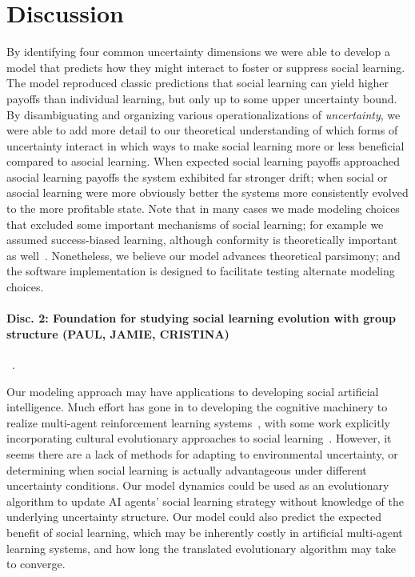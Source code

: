 \documentclass[letterpaper,11.5pt]{scrartcl}
\begin{document}
\section{Discussion}

By identifying four common uncertainty dimensions we were able to develop a model
that predicts how they might interact to foster or suppress social learning.
The model reproduced classic predictions that social learning can yield higher
payoffs than individual learning, but only up to some upper uncertainty bound.
By disambiguating and organizing various operationalizations of \emph{uncertainty},
we were able to add more detail to our theoretical understanding of which forms
of uncertainty interact in which ways to make social learning more or less
beneficial compared to asocial learning. When expected social learning payoffs
approached asocial learning payoffs the system exhibited far stronger drift; when
social or asocial learning were more obviously better the systems more consistently
evolved to the more profitable state. Note that in many cases we made modeling choices
that excluded some important mechanisms of social learning; for example we 
assumed success-biased learning, although conformity is theoretically important
as well~\cite{Muthukrishna2016a,Smaldino2018b}. Nonetheless, we believe our model
advances theoretical parsimony; and the software implementation is designed to
facilitate testing alternate modeling choices. 

\paragraph{Disc. 2: Foundation for studying social learning evolution with group
structure (PAUL, JAMIE, CRISTINA)}~\cite{Katsnelson2014}.

Our modeling approach may have applications to developing social artificial 
intelligence. Much effort has gone in to developing the cognitive machinery
to realize multi-agent reinforcement learning
systems~\cite{Sandholm1996,Ndousse2021,Gronauer2022}, with some work explicitly
incorporating cultural evolutionary approaches to social learning~\cite{Jaques2019}.
However, it seems there are a lack of methods for adapting
to environmental uncertainty, or determining when social learning is actually
advantageous under different uncertainty conditions. Our model dynamics could
be used as an evolutionary algorithm to update AI agents' social learning
strategy without knowledge of the underlying uncertainty structure.
Our model could also predict the expected benefit of social learning,
which may be inherently costly in artificial multi-agent learning systems, 
and how long the translated evolutionary algorithm may take to converge.





\end{document}
